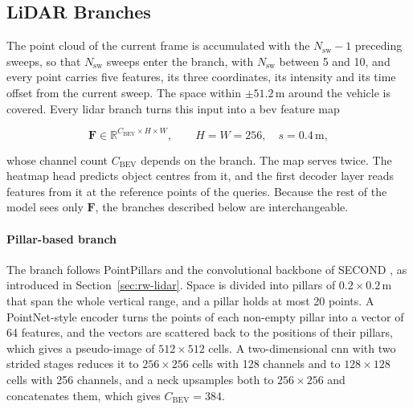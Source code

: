 \subsection{LiDAR Branches}
\label{sec:design-lidar}

The point cloud of the current frame is accumulated with the $N_{\mathrm{sw}} - 1$ preceding sweeps, so that
$N_{\mathrm{sw}}$ sweeps enter the branch, with $N_{\mathrm{sw}}$ between 5 and 10, and every point carries
five features, its three coordinates, its intensity and its time offset from the current sweep. The space
within $\pm 51.2$\,m around the vehicle is covered. Every \ac{lidar} branch turns this input into a \ac{bev}
feature map

\begin{equation}
    \mathbf{F} \in \mathbb{R}^{C_{\mathrm{BEV}} \times H \times W}, \qquad H = W = 256,\quad s = 0.4\,\mathrm{m},
    \label{eq:design-bev}
\end{equation}

whose channel count $C_{\mathrm{BEV}}$ depends on the branch. The map serves twice. The heatmap head predicts
object centres from it, and the first decoder layer reads features from it at the reference points of the
queries. Because the rest of the model sees only $\mathbf{F}$, the branches described below are
interchangeable.

\paragraph{Pillar-based branch}

The branch follows PointPillars \cite{Lang2019PointPillars} and the convolutional backbone of SECOND
\cite{Yan2018SECOND}, as introduced in Section~\ref{sec:rw-lidar}. Space is divided into pillars of
$0.2 \times 0.2$\,m that span the whole vertical range, and a pillar holds at most 20 points. A PointNet-style
encoder \cite{Qi2017PointNet} turns the points of each non-empty pillar into a vector of 64 features, and the
vectors are scattered back to the positions of their pillars, which gives a pseudo-image of $512 \times 512$
cells. A two-dimensional \ac{cnn} with two strided stages reduces it to $256 \times 256$ cells with 128
channels and to $128 \times 128$ cells with 256 channels, and a neck upsamples both to $256 \times 256$ and
concatenates them, which gives $C_{\mathrm{BEV}} = 384$.

